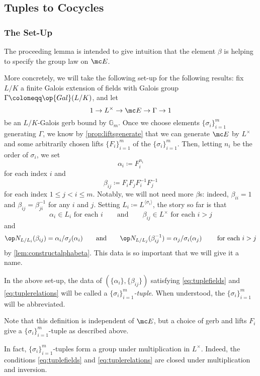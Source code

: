 \documentclass{article}
\numberwithin{equation}{section}
\begin{document}
\subsection{Tuples to Cocycles}
\subsubsection{The Set-Up}
The proceeding lemma is intended to give intuition that the element $\beta$ is helping to specify the group law on $\mc E$.

More concretely, we will take the following set-up for the following results: fix $L/K$ a finite Galois extension of fields with Galois group $\Gamma\coloneqq\op{Gal}(L/K)$, and let
\[1\to L^\times\to\mc E\to\Gamma\to1\]
be an $L/K$-Galois gerb bound by $\mathbb G_m$. Once we choose elements $\{\sigma_i\}_{i=1}^m$ generating $\Gamma$, we know by \autoref{prop:liftsgenerate} that we can generate $\mc E$ by $L^\times$ and some arbitrarily chosen lifts $\{F_i\}_{i=1}^m$ of the $\{\sigma_i\}_{i=1}^m$. Then, letting $n_i$ be the order of $\sigma_i$, we set
\[\alpha_i\coloneqq F_i^{n_i}\]
for each index $i$ and
\[\beta_{ij}\coloneqq F_iF_jF_i^{-1}F_j^{-1}\]
for each index $1\le j<i\le m$. Notably, we will not need more $\beta$s: indeed, $\beta_{ii}=1$ and $\beta_{ij}=\beta_{ji}^{-1}$ for any $i$ and $j$. Setting $L_i\coloneqq L^{\langle\sigma_i\rangle}$, the story so far is that
\begin{equation}
	\alpha_i\in L_i\text{ for each }i\qquad\text{and}\qquad\beta_{ij}\in L^\times\text{ for each }i>j \label{eq:tuplefields}
\end{equation}
and
\begin{equation}
	\op N_{L/L_i}(\beta_{ij})=\alpha_i/\sigma_j(\alpha_i)\qquad\text{and}\qquad\op N_{L/L_j}(\beta_{ij}^{-1})=\alpha_j/\sigma_i(\alpha_j)\qquad\text{ for each }i>j \label{eq:tuplerelations}
\end{equation}
by \autoref{lem:constructalphabeta}. This data is so important that we will give it a name.
\begin{definition}
	In the above set-up, the data of $(\{\alpha_i\},\{\beta_{ij}\})$ satisfying \autoref{eq:tuplefields} and \autoref{eq:tuplerelations} will be called a \textit{$\{\sigma_i\}_{i=1}^m$-tuple}. When understood, the $\{\sigma_i\}_{i=1}^m$ will be abbreviated.
\end{definition}
Note that this definition is independent of $\mc E$, but a choice of gerb and lifts $F_i$ give a $\{\sigma_i\}_{i=1}^m$-tuple as described above.
\begin{remark}
	In fact, $\{\sigma_i\}_{i=1}^m$-tuples form a group under multiplication in $L^\times$. Indeed, the conditions \autoref{eq:tuplefields} and \autoref{eq:tuplerelations} are closed under multiplication and inversion.
\end{remark}
\end{document}
